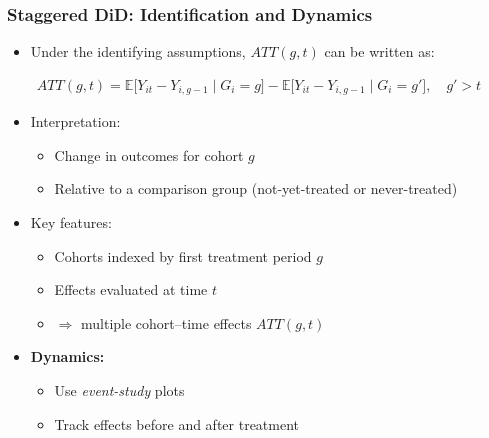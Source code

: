 \documentclass[12pt, compress]{beamer}
\begin{document}
\begin{frame}
	\frametitle{Staggered DiD: Identification and Dynamics}

\begin{itemize}
	\item Under the identifying assumptions, $ATT(g,t)$ can be written as:
\end{itemize}
\begin{align*}
ATT(g,t) 
= \mathbb{E}\big[ Y_{it} - Y_{i,g-1} \mid G_i = g \big]
- \mathbb{E}\big[ Y_{it} - Y_{i,g-1} \mid G_i = g' \big], \quad g' > t
\end{align*}

\begin{itemize}
	\item Interpretation:
	\begin{itemize}
		\item Change in outcomes for cohort $g$
		\item Relative to a comparison group (not-yet-treated or never-treated)
	\end{itemize}
	
	\item Key features:
	\begin{itemize}
		\item Cohorts indexed by first treatment period $g$
		\item Effects evaluated at time $t$
		\item $\Rightarrow$ multiple cohort--time effects $ATT(g,t)$
	\end{itemize}
	
	\item \textbf{Dynamics:}
	\begin{itemize}
		\item Use \textit{event-study} plots
		\item Track effects before and after treatment
	\end{itemize}
\end{itemize}

\end{frame}
\end{document}
